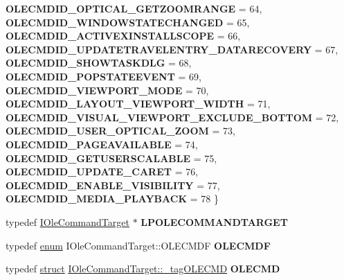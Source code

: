 \begin{DoxyCompactItemize}
{\bfseries O\+L\+E\+C\+M\+D\+I\+D\+\_\+\+O\+P\+T\+I\+C\+A\+L\+\_\+\+G\+E\+T\+Z\+O\+O\+M\+R\+A\+N\+GE} = 64, 
{\bfseries O\+L\+E\+C\+M\+D\+I\+D\+\_\+\+W\+I\+N\+D\+O\+W\+S\+T\+A\+T\+E\+C\+H\+A\+N\+G\+ED} = 65, 
{\bfseries O\+L\+E\+C\+M\+D\+I\+D\+\_\+\+A\+C\+T\+I\+V\+E\+X\+I\+N\+S\+T\+A\+L\+L\+S\+C\+O\+PE} = 66, 
\newline
{\bfseries O\+L\+E\+C\+M\+D\+I\+D\+\_\+\+U\+P\+D\+A\+T\+E\+T\+R\+A\+V\+E\+L\+E\+N\+T\+R\+Y\+\_\+\+D\+A\+T\+A\+R\+E\+C\+O\+V\+E\+RY} = 67, 
{\bfseries O\+L\+E\+C\+M\+D\+I\+D\+\_\+\+S\+H\+O\+W\+T\+A\+S\+K\+D\+LG} = 68, 
{\bfseries O\+L\+E\+C\+M\+D\+I\+D\+\_\+\+P\+O\+P\+S\+T\+A\+T\+E\+E\+V\+E\+NT} = 69, 
{\bfseries O\+L\+E\+C\+M\+D\+I\+D\+\_\+\+V\+I\+E\+W\+P\+O\+R\+T\+\_\+\+M\+O\+DE} = 70, 
\newline
{\bfseries O\+L\+E\+C\+M\+D\+I\+D\+\_\+\+L\+A\+Y\+O\+U\+T\+\_\+\+V\+I\+E\+W\+P\+O\+R\+T\+\_\+\+W\+I\+D\+TH} = 71, 
{\bfseries O\+L\+E\+C\+M\+D\+I\+D\+\_\+\+V\+I\+S\+U\+A\+L\+\_\+\+V\+I\+E\+W\+P\+O\+R\+T\+\_\+\+E\+X\+C\+L\+U\+D\+E\+\_\+\+B\+O\+T\+T\+OM} = 72, 
{\bfseries O\+L\+E\+C\+M\+D\+I\+D\+\_\+\+U\+S\+E\+R\+\_\+\+O\+P\+T\+I\+C\+A\+L\+\_\+\+Z\+O\+OM} = 73, 
{\bfseries O\+L\+E\+C\+M\+D\+I\+D\+\_\+\+P\+A\+G\+E\+A\+V\+A\+I\+L\+A\+B\+LE} = 74, 
\newline
{\bfseries O\+L\+E\+C\+M\+D\+I\+D\+\_\+\+G\+E\+T\+U\+S\+E\+R\+S\+C\+A\+L\+A\+B\+LE} = 75, 
{\bfseries O\+L\+E\+C\+M\+D\+I\+D\+\_\+\+U\+P\+D\+A\+T\+E\+\_\+\+C\+A\+R\+ET} = 76, 
{\bfseries O\+L\+E\+C\+M\+D\+I\+D\+\_\+\+E\+N\+A\+B\+L\+E\+\_\+\+V\+I\+S\+I\+B\+I\+L\+I\+TY} = 77, 
{\bfseries O\+L\+E\+C\+M\+D\+I\+D\+\_\+\+M\+E\+D\+I\+A\+\_\+\+P\+L\+A\+Y\+B\+A\+CK} = 78
 \}
\item 
\mbox{\label{interface_i_ole_command_target_aa000c6b56cb2c8e3216328cd59daeef7}} 
typedef \hyperlink{interface_i_ole_command_target}{I\+Ole\+Command\+Target} $\ast$ {\bfseries L\+P\+O\+L\+E\+C\+O\+M\+M\+A\+N\+D\+T\+A\+R\+G\+ET}
\item 
\mbox{\label{interface_i_ole_command_target_ae93b78f4b0f536ead1e9ae795807f71c}} 
typedef \hyperlink{interfaceenum}{enum} I\+Ole\+Command\+Target\+::\+O\+L\+E\+C\+M\+DF {\bfseries O\+L\+E\+C\+M\+DF}
\item 
\mbox{\label{interface_i_ole_command_target_a557a75a729bc40863a0611c255219d8f}} 
typedef \hyperlink{interfacestruct}{struct} \hyperlink{struct_i_ole_command_target_1_1__tag_o_l_e_c_m_d}{I\+Ole\+Command\+Target\+::\+\_\+tag\+O\+L\+E\+C\+MD} {\bfseries O\+L\+E\+C\+MD}

\end{DoxyCompactItemize}
